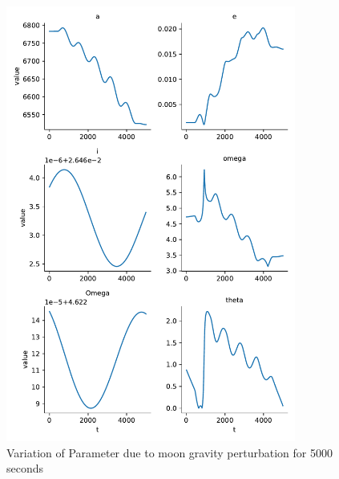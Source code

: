 \begin{figure}[H]
    \centering
    \includegraphics[width=0.85\textwidth]{../Figure/Q2/orbital_elements_variation_moon_5000}
    \caption{Variation of Parameter due to moon gravity perturbation for 5000 seconds}
\end{figure}


